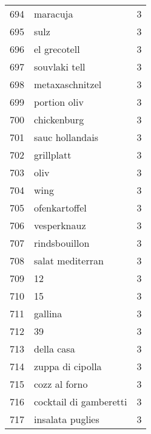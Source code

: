 \begin{tabular}{llr}
694  &                                           maracuja &      3 \\
695  &                                               sulz &      3 \\
696  &                                       el grecotell &      3 \\
697  &                                      souvlaki tell &      3 \\
698  &                                    metaxaschnitzel &      3 \\
699  &                                       portion oliv &      3 \\
700  &                                        chickenburg &      3 \\
701  &                                    sauc hollandais &      3 \\
702  &                                         grillplatt &      3 \\
703  &                                               oliv &      3 \\
704  &                                               wing &      3 \\
705  &                                      ofenkartoffel &      3 \\
706  &                                        vesperknauz &      3 \\
707  &                                      rindsbouillon &      3 \\
708  &                                   salat mediterran &      3 \\
709  &                                                 12 &      3 \\
710  &                                                 15 &      3 \\
711  &                                            gallina &      3 \\
712  &                                                 39 &      3 \\
713  &                                         della casa &      3 \\
714  &                                   zuppa di cipolla &      3 \\
715  &                                      cozz al forno &      3 \\
716  &                             cocktail di gamberetti &      3 \\
717  &                                   insalata puglies &      3 \\

\end{tabular}
